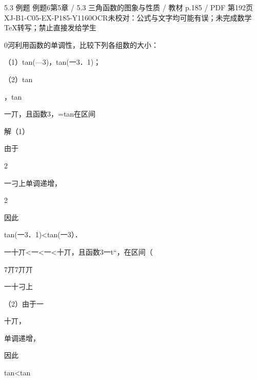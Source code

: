 \begin{bankitem}{5.3 例题 例题6}{第5章 / 5.3 三角函数的图象与性质 / 教材 p.185 / PDF 第192页}{XJ-B1-C05-EX-P185-Y1160}{OCR未校对：公式与文字均可能有误；未完成数学TeX转写；禁止直接发给学生}
\begin{ocrdraft}
\par
0河利用函数的单调性，比较下列各组数的大小：
\par
（1）tan(—3)，tan(一3．1)；
\par
（2）tan
\par
，tan
\par
一丌，且函数3，=tan在区间
\par
解（1）
\par
由于
\par
2
\par
一刁上单调递增，
\par
2
\par
因此
\par
tan(一3．1)<tan(一3）．
\par
一十丌<一<一<十丌，且函数3一t“，在区间（
\par
7丌7丌丌
\par
一十刁上
\par
（2）由于一
\par
十丌，
\par
单调递增，
\par
因此
\par
tan<tan
\end{ocrdraft}
\end{bankitem}
